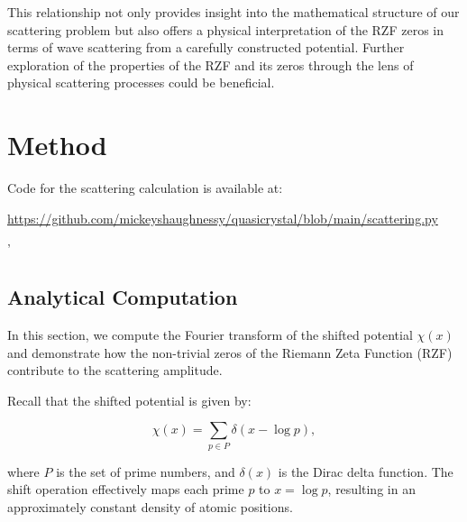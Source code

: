 \documentclass[11pt, oneside]{article}
\begin{document}
This relationship not only provides insight into the mathematical structure of our scattering problem but also offers a physical interpretation of the RZF zeros in terms of wave scattering from a carefully constructed potential. Further exploration of the properties of the RZF and its zeros through the lens of physical scattering processes could be beneficial.

\section{Method}

Code for the scattering calculation is available at:
 
\url{https://github.com/mickeyshaughnessy/quasicrystal/blob/main/scattering.py}

'
% 
%

\subsection{Analytical Computation}

In this section, we compute the Fourier transform of the shifted potential $\chi(x)$ and demonstrate how the non-trivial zeros of the Riemann Zeta Function (RZF) contribute to the scattering amplitude.

Recall that the shifted potential is given by:

\begin{equation}
\chi(x) = \sum_{p \in P} \delta\left(x - \log p\right),
\end{equation}

where $P$ is the set of prime numbers, and $\delta(x)$ is the Dirac delta function. The shift operation effectively maps each prime $p$ to $x = \log p$, resulting in an approximately constant density of atomic positions.
\end{document}
